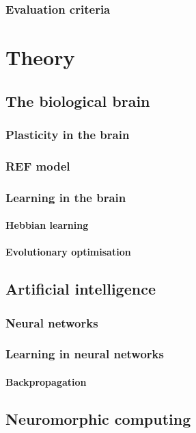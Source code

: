 \documentclass[a4paper,oneside]{memoir}
\begin{document}
  \subsection{Evaluation criteria} \label{sec:hypothesis-criteria}

\chapter{Theory}

  \section{The biological brain}
  \subsection{Plasticity in the brain}
  \subsection{REF model}

  \subsection{Learning in the brain}
  \subsubsection{Hebbian learning}
  \subsubsection{Evolutionary optimisation}

  \section{Artificial intelligence}
  \subsection{Neural networks} \label{sec:NN}
  \subsection{Learning in neural networks}
  \subsubsection{Backpropagation}

  \section{Neuromorphic computing}
\end{document}
